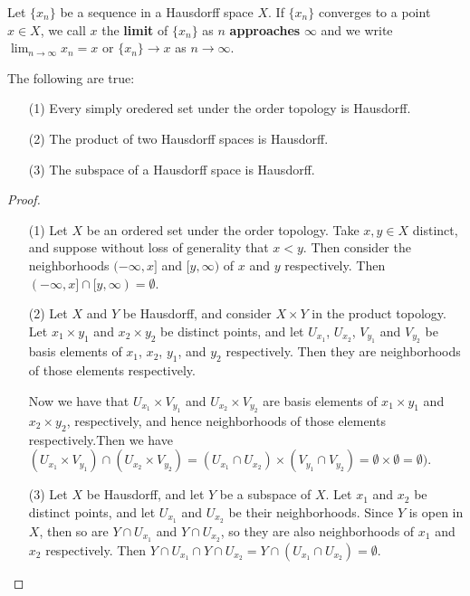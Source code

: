 \begin{definition}
    Let $\{x_n\}$ be a sequence in a Hausdorff space  $X$. If  $\{x_n\}$
    converges to a point $x \in X$, we call  $x$ the \textbf{limit} of
    $\{x_n\}$ as $n$  \textbf{approaches} $\infty$ and we write $\lim_{n
    \rightarrow \infty}{x_n}=x$ or $\{x_n\} \rightarrow x$ as $n \rightarrow
    \infty$.
\end{definition}

\begin{theorem}\label{1.6.12}
    The following are true:
        \begin{enumerate}
            \item[(1)] Every simply oredered set under the order topology is
                Hausdorff.

            \item[(2)] The product of two Hausdorff spaces is Hausdorff.

            \item[(3)] The subspace of a Hausdorff space is Hausdorff.
        \end{enumerate}
\end{theorem}
\begin{proof}
    \begin{enumerate}
        \item[(1)] Let $X$ be an ordered set under the order topology. Take  $x,y \in
            X$ distinct, and suppose without loss of generality that $x<y$. Then
            consider the neighborhoods  $(-\infty,x]$ and  $[y,\infty)$ of  $x$
            and  $y$ respectively. Then  $(-\infty,x] \cap
            [y,\infty)=\emptyset$.

        \item[(2)] Let $X$ and  $Y$ be Hausdorff, and consider  $X \times Y$ in the
            product topology. Let  $ x_1 \times y_1$ and $ x_2 \times y_2$ be
            distinct points, and let $U_{x_1}$, $U_{x_2}$, $V_{y_1}$ and
            $V_{y_2}$ be basis elements of $ x_1$, $ x_2$, $y_1$, and $y_2$
            respectively. Then they are neighborhoods of those elements
            respectively.

            Now we have that $U_{x_1} \times V_{y_1}$ and $U_{x_2} \times
            V_{y_2}$ are basis elements of $ x_1 \times y_1$ and $ x_2 \times
            y_2$, respectively, and hence neighborhoods of those elements
            respectively.Then we have $(U_{x_1} \times V_{y_1}) \cap (U_{x_2} \times
            V_{y_2})=(U_{x_1} \cap U_{x_2}) \times (V_{y_1} \cap V_{y_2}) = \emptyset
            \times \emptyset =\emptyset)$.

        \item[(3)] Let $X$ be Hausdorff, and let  $Y$ be a subspace of  $X$. Let  $x_1$
            and $x_2$ be distinct points, and let  $U_{x_1}$ and $U_{x_2}$ be
            their neighborhoods. Since $Y$ is open in  $X$, then so are  $Y \cap
            U_{x_1}$ and $Y \cap U_{x_2}$, so they are also neighborhoods of $
            x_1$ and $ x_2$ respectively. Then $Y \cap
            U_{x_1} \cap Y \cap U_{x_2}=Y \cap (U_{x_1} \cap
            U_{x_2})=\emptyset$.
    \end{enumerate}
\end{proof}
